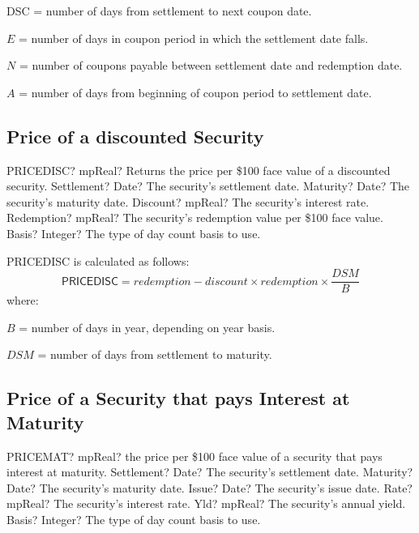 DSC = number of days from settlement to next coupon date.

$E$ = number of days in coupon period in which the settlement date falls.

$N$ = number of coupons payable between settlement date and redemption date.

$A$ = number of days from beginning of coupon period to settlement date.



\subsection{Price of a discounted Security}


\begin{mpFunctionsExtract}
	\mpWorksheetFunctionFiveNotImplemented
	{PRICEDISC? mpReal? Returns the price per \$100 face value of a discounted security.}
	{Settlement? Date?  The security's settlement date.}
	{Maturity? Date? The security's maturity date.}
	{Discount? mpReal? The security's interest rate.}
	{Redemption? mpReal? The security's redemption value per \$100 face value.}
	{Basis? Integer? The type of day count basis to use.}
\end{mpFunctionsExtract}

\vspace{0.3cm}
PRICEDISC is calculated as follows:
\begin{equation}
\textsf{PRICEDISC} = redemption - discount \times redemption \times \frac{DSM}{B}
\end{equation}
where:

$B$ = number of days in year, depending on year basis.

$DSM$ = number of days from settlement to maturity.




\subsection{Price of a Security that pays Interest at Maturity}

\begin{mpFunctionsExtract}
	\mpWorksheetFunctionSixNotImplemented
	{PRICEMAT? mpReal? the price per \$100 face value  of a security that pays interest at maturity.}
	{Settlement? Date?  The security's settlement date.}
	{Maturity? Date? The security's maturity date.}
	{Issue? Date? The security's issue date.}
	{Rate? mpReal? The security's interest rate.}
	{Yld? mpReal? The security's annual yield.}
	{Basis? Integer? The type of day count basis to use.}
\end{mpFunctionsExtract}

